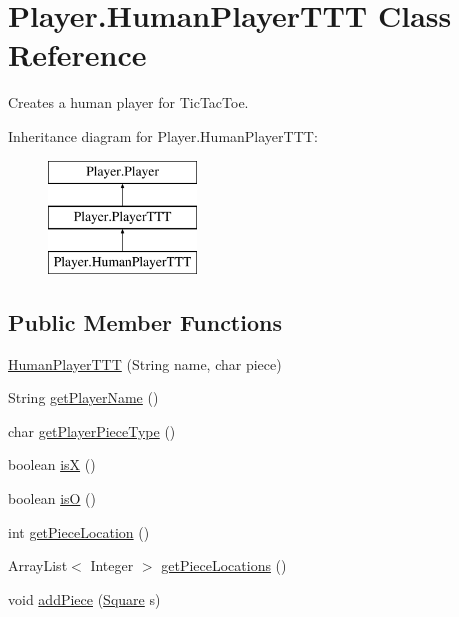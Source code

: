 \hypertarget{class_player_1_1_human_player_t_t_t}{}\section{Player.\+Human\+Player\+T\+T\+T Class Reference}
\label{class_player_1_1_human_player_t_t_t}


Creates a human player for Tic\+Tac\+Toe.  


Inheritance diagram for Player.\+Human\+Player\+T\+T\+T\+:\begin{figure}[H]
\begin{center}
\leavevmode
\includegraphics[height=3.000000cm]{class_player_1_1_human_player_t_t_t}
\end{center}
\end{figure}
\subsection*{Public Member Functions}
\begin{DoxyCompactItemize}
\item 
\hyperlink{class_player_1_1_human_player_t_t_t_a617376ebf70bbb54f6ac722b1e9282a7}{Human\+Player\+T\+T\+T} (String name, char piece)
\item 
String \hyperlink{class_player_1_1_human_player_t_t_t_aadf14d433f944233d05f88cafb5e6a94}{get\+Player\+Name} ()
\item 
char \hyperlink{class_player_1_1_human_player_t_t_t_a3b80370f155683b77911850cc016e6a7}{get\+Player\+Piece\+Type} ()
\item 
boolean \hyperlink{class_player_1_1_human_player_t_t_t_a9c97f1c97829c9af212b8088e80ec7db}{is\+X} ()
\item 
boolean \hyperlink{class_player_1_1_human_player_t_t_t_acce1adf858320b165c07b8250b865edb}{is\+O} ()
\item 
int \hyperlink{class_player_1_1_human_player_t_t_t_a50f86fdac0e60ab7302f99f1ad25953b}{get\+Piece\+Location} ()
\item 
Array\+List$<$ Integer $>$ \hyperlink{class_player_1_1_human_player_t_t_t_accd55d5ba0f1bfc95ff64c3b15c57840}{get\+Piece\+Locations} ()
\item 
void \hyperlink{class_player_1_1_human_player_t_t_t_ab65859ad968e025536e8434efad24a6a}{add\+Piece} (\hyperlink{class_square_1_1_square}{Square} s)
\end{DoxyCompactItemize}
